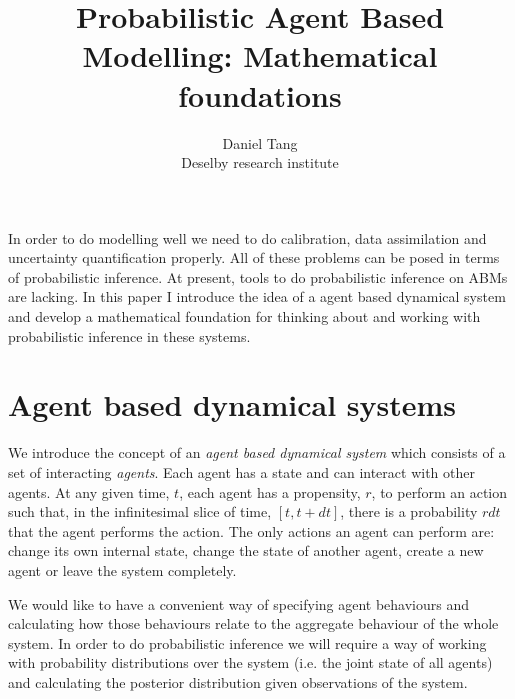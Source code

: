 \documentclass[letterpaper,twocolumn,10pt]{article}
\begin{document}
\title{\Large \bf Probabilistic Agent Based Modelling: Mathematical foundations}

\author{
{\rm Daniel Tang}\\
Deselby research institute
}

\maketitle


\abstract
In order to do modelling well we need to do calibration, data assimilation and uncertainty quantification properly. All of these problems can be posed in terms of probabilistic inference. At present, tools to do probabilistic inference on ABMs are lacking. In this paper I introduce the idea of a agent based dynamical system and develop a mathematical foundation for thinking about and working with probabilistic inference in these systems.

\section{Agent based dynamical systems}
We introduce the concept of an \textit{agent based dynamical system} which consists of a set of interacting \textit{agents}. Each agent has a state and can interact with other agents. At any given time, $t$, each agent has a propensity, $r$, to perform an action such that, in the infinitesimal slice of time, $[t, t+dt]$, there is a probability $rdt$ that the agent performs the action. The only actions an agent can perform are: change its own internal state, change the state of another agent, create a new agent or leave the system completely.

We would like to have a convenient way of specifying agent behaviours and calculating how those behaviours relate to the aggregate behaviour of the whole system. In order to do probabilistic inference we will require a way of working with probability distributions over the system (i.e. the joint state of all agents) and calculating the posterior distribution given observations of the system.
\end{document}
